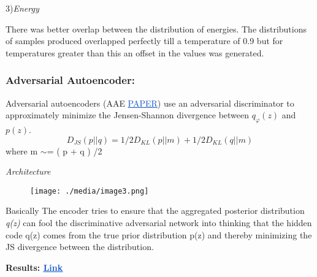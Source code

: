 \documentclass[12pt,a4paper]{article}
\begin{document}
3)\textit{Energy}\par

There was better overlap between the distribution of energies. The distributions of samples produced overlapped perfectly till a temperature of 0.9 but for temperatures greater than this an offset in the values was generated.\par
\vspace{\baselineskip}
\subsubsection{Adversarial Autoencoder:}
Adversarial autoencoders (AAE  \href{https://arxiv.org/pdf/1511.05644.pdf}{}\textcolor[HTML]{1155CC}{\uline{PAPER}}) use an adversarial discriminator to approximately minimize the Jensen-Shannon divergence between $q_{ \varphi  }(z)$ and $p(z)$.
\begin{equation}
   D_{JS} ( p \vert \vert q ) = 1/2 D_{KL} ( p \vert \vert m ) + 1/2 D_{KL} ( q \vert \vert m )
\end{equation}
where m $\sim$=  ( p + q ) /2
\begin{FlushLeft}
\textit{Architecture}
\end{FlushLeft}\par
\begin{figure}[H]
	\begin{Center}
		\texttt{[image: ./media/image3.png]}
	\end{Center}
\end{figure}

\begin{FlushLeft}
Basically The encoder tries to ensure that the aggregated posterior distribution \textit{q(z)} can fool the discriminative adversarial network into thinking that the hidden code q(z) comes from the true prior distribution p(z) and thereby minimizing the JS divergence between the distribution.
\end{FlushLeft}\par


\vspace{\baselineskip}
\begin{FlushLeft}
\textbf{Results: \href{https://drive.google.com/open?id=1NQrICBJTVvlPX1fSr1bGb68BN8iwCMni}{\textcolor[HTML]{1155CC}{\uline{Link}}}}
\end{FlushLeft}\par
\end{document}
